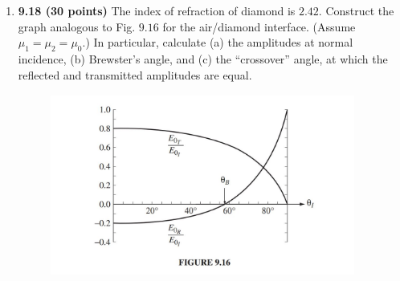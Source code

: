 \documentclass[fleqn]{article}
\begin{document}
  \begin{enumerate}
    \item \textbf{9.18 (30 points)} The index of refraction of diamond is $2.42$. Construct the graph analogous to Fig. $9.16$ for the air/diamond 
    interface. (Assume  $\mu_1=\mu_2=\mu_0$.) In particular, calculate (a) the amplitudes at normal incidence, (b) Brewster’s angle, and (c)
    the “crossover” angle, at which the reflected and transmitted amplitudes are equal.

      \begin{figure}[h!]
        \centering
        \includegraphics[height=6cm, width=10cm]{figure9.16.JPG}
      \end{figure}


\end{enumerate}
\end{document}
